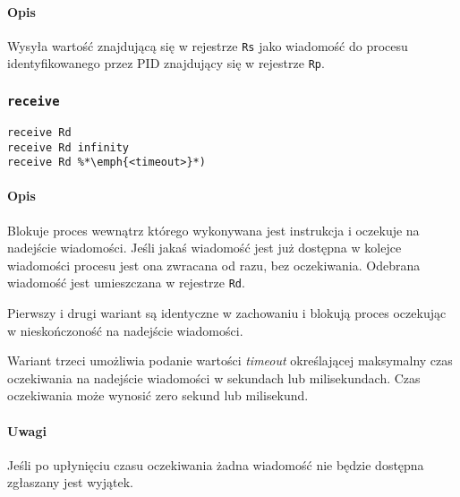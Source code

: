 \paragraph*{Opis} Wysyła wartość znajdującą się w rejestrze \texttt{Rs} jako
wiadomość do procesu identyfikowanego przez PID znajdujący się w rejestrze
\texttt{Rp}.

\subsubsection{\texttt{receive}}

\begin{lstlisting}
receive Rd
receive Rd infinity
receive Rd %*\emph{<timeout>}*)
\end{lstlisting}

\paragraph*{Opis} Blokuje proces wewnątrz którego wykonywana jest instrukcja i
oczekuje na nadejście wiadomości. Jeśli jakaś wiadomość jest już dostępna w
kolejce wiadomości procesu jest ona zwracana od razu, bez oczekiwania. Odebrana
wiadomość jest umieszczana w rejestrze \texttt{Rd}.

Pierwszy i drugi wariant są identyczne w zachowaniu i blokują proces oczekując
w nieskończoność na nadejście wiadomości.

Wariant trzeci umożliwia podanie wartości \emph{timeout} określającej maksymalny
czas oczekiwania na nadejście wiadomości w sekundach lub milisekundach. Czas
oczekiwania może wynosić zero sekund lub milisekund.

\paragraph*{Uwagi}

Jeśli po upłynięciu czasu oczekiwania żadna wiadomość nie będzie dostępna
zgłaszany jest wyjątek.
